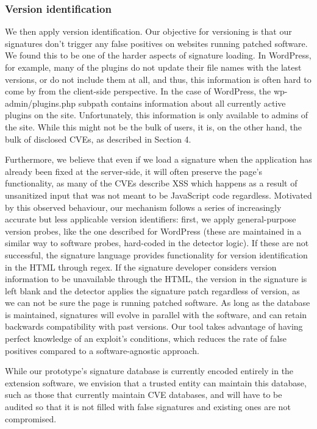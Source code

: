 \subsubsection{Version identification}
We then apply version identification. Our objective for versioning is that our signatures don't trigger any false positives on websites running patched software. We found this to be one of the harder aspects of signature loading. In WordPress, for example, many of the plugins do not update their file names with the latest versions, or do not include them at all, and thus, this information is often hard to come by from the client-side perspective. In the case of WordPress, the wp-admin/plugins.php subpath contains information about all currently active plugins on the site. Unfortunately, this information is only available to admins of the site. While this might not be the bulk of users, it is, on the other hand, the bulk of disclosed CVEs, as described in Section 4.

 Furthermore, we believe that even if we load a signature when the application has already been fixed at the server-side, it will often preserve the page's functionality, as many of the CVEs describe XSS which happens as a result of unsanitized input that was not meant to be JavaScript code regardless. Motivated by this observed behaviour, our mechanism follows a series of increasingly accurate but less applicable version identifiers: first, we apply general-purpose version probes, like the one described for WordPress (these are maintained in a similar way to software probes, hard-coded in the detector logic). If these are not successful, the signature language provides functionality for version identification in the HTML through regex. If the signature developer considers version information to be unavailable through the HTML, the version in the signature is left blank and the detector applies the signature patch regardless of version, as we can not be sure the page is running patched software. As long as the database is maintained, signatures will evolve in parallel with the software, and can retain backwards compatibility with past versions. Our tool takes advantage of having perfect knowledge of an exploit's conditions, which reduces the rate of false positives compared to a software-agnostic approach.

While our prototype's signature database is currently encoded entirely in the extension software, we envision that a trusted entity can maintain this database, such as those that currently maintain CVE databases, and will have to be audited so that it is not filled with false signatures and existing ones are not compromised.